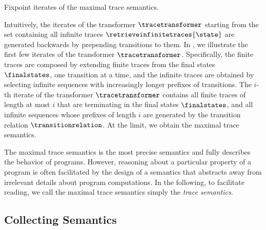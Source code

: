 \begin{marginfigure}
\caption{Fixpoint iterates of the maximal trace semantics.}
\end{marginfigure}

Intuitively, the iterates of the transformer $\tracetransformer$ starting from the set containing all infinite traces $\retrieveinfinitetraces{\state}$ are generated backwards by prepending transitions to them. In , we illustrate the first few iterates of the transformer $\tracetransformer$.
Specifically, the finite traces are composed by extending finite traces from the final states $\finalstates$, one transition at a time, and the infinite traces are obtained by selecting infinite sequences with increasingly longer prefixes of transitions.
The $i$-th iterate of the transformer $\tracetransformer$ contains all finite traces of length at most $i$ that are terminating in the final states $\finalstates$, and all infinite sequences whose prefixes of length $i$ are generated by the transition relation $\transitionrelation$.
At the limit, we obtain the maximal trace semantics.

The maximal trace semantics is the most precise semantics and fully describes the behavior of programs. However, reasoning about a particular property of a program is often facilitated by the design of a semantics that abstracts away from irrelevant details about program computations.
In the following, to facilitate reading, we call the maximal trace semantics simply the \emph{trace semantics}.


\subsection{Collecting Semantics}

